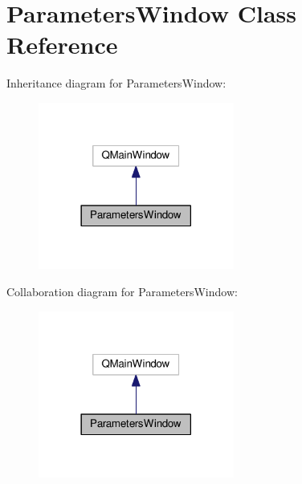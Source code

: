 \hypertarget{class_parameters_window}{}\section{Parameters\+Window Class Reference}
\label{class_parameters_window}


Inheritance diagram for Parameters\+Window\+:
\nopagebreak
\begin{figure}[H]
\begin{center}
\leavevmode
\includegraphics[width=182pt]{class_parameters_window__inherit__graph}
\end{center}
\end{figure}


Collaboration diagram for Parameters\+Window\+:
\nopagebreak
\begin{figure}[H]
\begin{center}
\leavevmode
\includegraphics[width=182pt]{class_parameters_window__coll__graph}
\end{center}
\end{figure}
